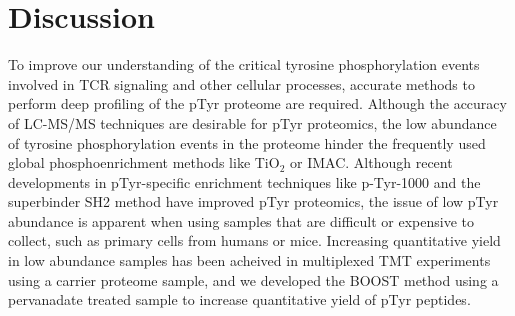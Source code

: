 \documentclass[journal=jprobs,manuscript=article]{achemso}
\begin{document}
\section{Discussion}

To improve our understanding of the critical tyrosine phosphorylation events involved in TCR signaling and other cellular processes, accurate methods to perform deep profiling of the pTyr proteome are required. Although the accuracy of LC-MS/MS techniques are desirable for pTyr proteomics, the low abundance of tyrosine phosphorylation events in the proteome hinder the frequently used global phosphoenrichment methods like TiO$_{2}$ or IMAC\cite{navarro2011phosphoproteomic,prado2021synergistic,thingholm2006highly,thingholm2016use,thingholm2016phosphopeptide}. Although recent developments in pTyr-specific enrichment techniques like p-Tyr-1000 and the superbinder SH2 method have improved pTyr proteomics\cite{kaneko2012superbinder,bian2016ultra,dong2017sensitive,tong2017protein,yao2018sh2,yao2019one,chua2020tandem}, the issue of low pTyr abundance is apparent when using samples that are difficult or expensive to collect, such as primary cells from humans or mice\cite{salter2021comparative,ramello2019immunoproteomic,locard2020lymphoatlas}. Increasing quantitative yield in low abundance samples has been acheived in multiplexed TMT experiments using a carrier proteome sample\cite{petelski2021multiplexed,stopfer2021quantitative,cheung2021defining}, and we developed the BOOST method using a pervanadate treated sample to increase quantitative yield of pTyr peptides\cite{chua2020tandem,chua2021ovalbumin}.
\end{document}
